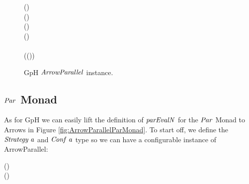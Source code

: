 \documentclass[paper=A4,twoside=true,openright,parskip=full,chapterprefix=true,headings=normal,bibliography=totoc,listof=totoc,titlepage=on,captions=tableabove,draft=false,british]{scrreprt}%
\begin{document}
\begin{figure}[h]
\centering
\begin{hscode}\SaveRestoreHook
{}%
%
%
%
%
\>[B]{}\;\;\mathrel{=}\;(\;){}\<[E]%
\\[\blanklineskip]%
\>[B]{}\;(\;)\Rightarrow {}\<[E]%
\\
\>[B]{}\<[3]%
\>[3]{}\;\;\;\;(\;)\;\<[E]%
\\
\>[3]{}\<[5]%
\>[5]{}\;(\;)\;\mathrel{=}{}\<[E]%
\\
\>[5]{}\<[9]%
\>[9]{}\;\mathbin{>\!\!>\!\!>}{}\<[E]%
\\
\>[5]{}\<[9]%
\>[9]{}\;(\;(\;)){}\<[E]%
\ColumnHook
\end{hscode}\resethooks
\caption{GpH \ensuremath{\Conid{ArrowParallel}} instance.}\label{fig:ArrowParallelMulticore}\end{figure}

\hypertarget{par-monad-1}{%
\subsection{\texorpdfstring{\ensuremath{\Conid{Par}} Monad}{ Monad}}\label{par-monad-1}}

\label{sec:parrows:parmonad}

As for GpH we can easily lift the definition of \ensuremath{\Varid{parEvalN}} for the \ensuremath{\Conid{Par}}
Monad to Arrows in Figure \ref{fig:ArrowParallelParMonad}. To start off,
we define the \ensuremath{\Conid{Strategy}\;\Varid{a}} and \ensuremath{\Conid{Conf}\;\Varid{a}} type so we can have a
configurable instance of ArrowParallel:


\begin{hscode}\SaveRestoreHook
{}%
%
\>[B]{}\;\;\mathrel{=}\to {}\;(\;){}\<[E]%
\\
\>[B]{}\;\;\mathrel{=}\;(\;){}\<[E]%
\ColumnHook
\end{hscode}\resethooks
\vspace{-2\baselineskip}
\end{document}
